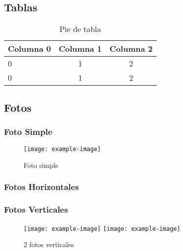 \subsection{Tablas}
\begin{table}[H]
    \centering
    \begin{tabular}{l|c|c} \hline
     Columna 0 & Columna 1 & Columna 2  \\ \hline
    0 & 1 & 2  \\ 
    0 & 1 & 2 \\ \hline
    \end{tabular}
    \caption{Pie de tabla}
    \label{tab:tabla simple}
\end{table}



\subsection{Fotos}
\subsubsection{Foto Simple}
\begin{figure}[H]
    \centering
    \texttt{[image: example-image]}
    \caption{Foto simple}
    \label{fig:foto simple}
\end{figure}

\subsubsection{Fotos Horizontales}
\begin{figure}[H]
    \label{fig:multi Fotos}
\end{figure}

\subsubsection{Fotos Verticales}
\begin{figure}[H]
    \centering
    \texttt{[image: example-image]}
    \texttt{[image: example-image]}
    \caption{2 fotos verticales}
    \label{fig:fotos verticales}
\end{figure}

